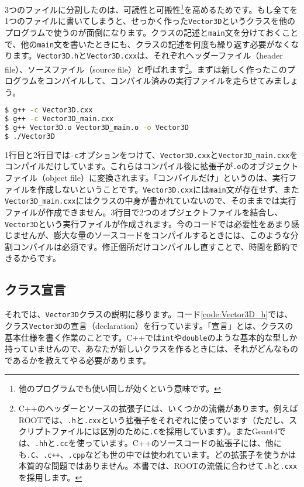 3つのファイルに分割したのは、可読性と可搬性\footnote{他のプログラムでも使い回しが効くという意味です。}を高めるためです。もし全てを1つのファイルに書いてしまうと、せっかく作った\texttt{Vector3D}というクラスを他のプログラムで使うのが面倒になります。クラスの記述と\texttt{main}文を分けておくことで、他の\texttt{main}文を書いたときにも、クラスの記述を何度も繰り返す必要がなくなります。\texttt{Vector3D.h}と\texttt{Vector3D.cxx}は、それぞれヘッダーファイル（header file）、ソースファイル（source file）と呼ばれます\footnote{C++のヘッダーとソースの拡張子には、いくつかの流儀があります。例えばROOTでは、\texttt{.h}と\texttt{.cxx}という拡張子をそれぞれに使っています（ただし、スクリプトファイルには区別のために\texttt{.C}を採用しています）。またGeant4では、\texttt{.hh}と\texttt{.cc}を使っています。C++のソースコードの拡張子には、他にも\texttt{.C}、\texttt{.c++}、\texttt{.cpp}なども世の中では使われています。どの拡張子を使うかは本質的な問題ではありません。本書では、ROOTの流儀に合わせて\texttt{.h}と\texttt{.cxx}を採用します。}。まずは新しく作ったこのプログラムをコンパイルして、コンパイル済みの実行ファイルを走らせてみましょう。
\begin{lstlisting}[language=bash]
$ g++ -c Vector3D.cxx
$ g++ -c Vector3D_main.cxx
$ g++ Vector3D.o Vector3D_main.o -o Vector3D
$ ./Vector3D
\end{lstlisting}
1行目と2行目では\texttt{-c}オプションをつけて、\texttt{Vector3D.cxx}と\texttt{Vector3D\_main.cxx}をコンパイルだけしています。これらはコンパイル後に拡張子が\texttt{.o}のオブジェクトファイル（object file）に変換されます。「コンパイルだけ」というのは、実行ファイルを作成しないということです。\texttt{Vector3D.cxx}には\texttt{main}文が存在せず、また\texttt{Vector3D\_main.cxx}にはクラスの中身が書かれていないので、そのままでは実行ファイルが作成できません。3行目で2つのオブジェクトファイルを結合し、\texttt{Vector3D}という実行ファイルが作成されます。今のコードでは必要性をあまり感じませんが、膨大な量のソースコードをコンパイルするときには、このような分割コンパイルは必須です。修正個所だけコンパイルし直すことで、時間を節約できるからです。

\subsection{クラス宣言}
それでは、\texttt{Vector3D}クラスの説明に移ります。コード\ref{code:Vector3D_h}では、クラス\texttt{Vector3D}の宣言（declaration）を行っています。「宣言」とは、クラスの基本仕様を書く作業のことです。C++では\texttt{int}や\texttt{double}のような基本的な型しか持っていませんので、あなたが新しいクラスを作るときには、それがどんなものであるかを教えてやる必要があります。


